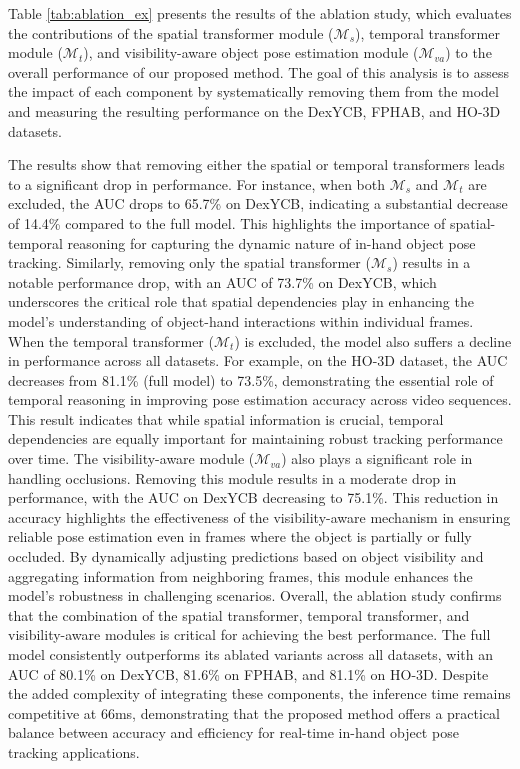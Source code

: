 Table \ref{tab:ablation_ex} presents the results of the ablation study, which evaluates the contributions of the spatial transformer module ($\mathcal{M}_{s}$), temporal transformer module ($\mathcal{M}_{t}$), and visibility-aware object pose estimation module ($\mathcal{M}_{va}$) to the overall performance of our proposed method. The goal of this analysis is to assess the impact of each component by systematically removing them from the model and measuring the resulting performance on the DexYCB, FPHAB, and HO-3D datasets.

The results show that removing either the spatial or temporal transformers leads to a significant drop in performance. For instance, when both $\mathcal{M}_{s}$ and $\mathcal{M}_{t}$ are excluded, the AUC drops to 65.7\% on DexYCB, indicating a substantial decrease of 14.4\% compared to the full model. This highlights the importance of spatial-temporal reasoning for capturing the dynamic nature of in-hand object pose tracking. Similarly, removing only the spatial transformer ($\mathcal{M}_{s}$) results in a notable performance drop, with an AUC of 73.7\% on DexYCB, which underscores the critical role that spatial dependencies play in enhancing the model's understanding of object-hand interactions within individual frames. When the temporal transformer ($\mathcal{M}_{t}$) is excluded, the model also suffers a decline in performance across all datasets. For example, on the HO-3D dataset, the AUC decreases from 81.1\% (full model) to 73.5\%, demonstrating the essential role of temporal reasoning in improving pose estimation accuracy across video sequences. This result indicates that while spatial information is crucial, temporal dependencies are equally important for maintaining robust tracking performance over time. The visibility-aware module ($\mathcal{M}_{va}$) also plays a significant role in handling occlusions. Removing this module results in a moderate drop in performance, with the AUC on DexYCB decreasing to 75.1\%. This reduction in accuracy highlights the effectiveness of the visibility-aware mechanism in ensuring reliable pose estimation even in frames where the object is partially or fully occluded. By dynamically adjusting predictions based on object visibility and aggregating information from neighboring frames, this module enhances the model's robustness in challenging scenarios. Overall, the ablation study confirms that the combination of the spatial transformer, temporal transformer, and visibility-aware modules is critical for achieving the best performance. The full model consistently outperforms its ablated variants across all datasets, with an AUC of 80.1\% on DexYCB, 81.6\% on FPHAB, and 81.1\% on HO-3D. Despite the added complexity of integrating these components, the inference time remains competitive at 66ms, demonstrating that the proposed method offers a practical balance between accuracy and efficiency for real-time in-hand object pose tracking applications.

